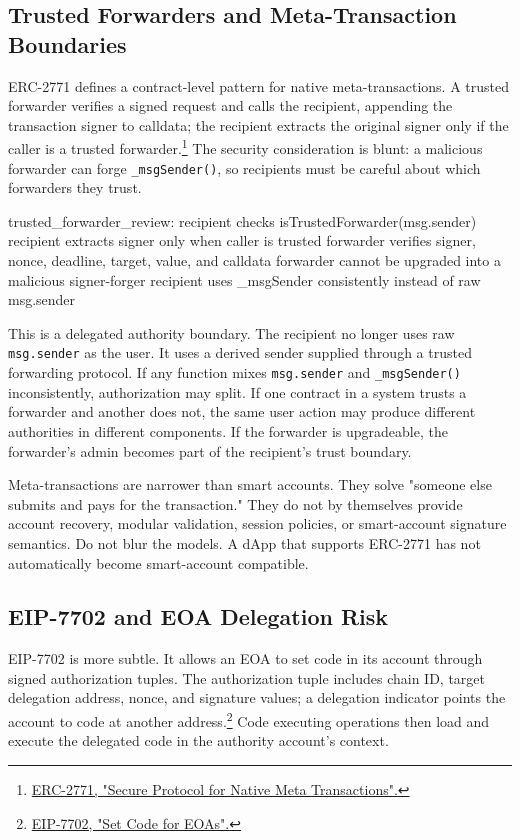 \subsection{Trusted Forwarders and Meta-Transaction Boundaries}

ERC-2771 defines a contract-level pattern for native meta-transactions. A trusted forwarder verifies a signed request and calls the recipient, appending the transaction signer to calldata; the recipient extracts the original signer only if the caller is a trusted forwarder.\footnote{\href{https://eips.ethereum.org/EIPS/eip-2771}{ERC-2771, "Secure Protocol for Native Meta Transactions".}} The security consideration is blunt: a malicious forwarder can forge \texttt{\_msgSender()}, so recipients must be careful about which forwarders they trust.

\begin{codeblock}
trusted_forwarder_review:
    recipient checks isTrustedForwarder(msg.sender)
    recipient extracts signer only when caller is trusted
    forwarder verifies signer, nonce, deadline, target, value, and calldata
    forwarder cannot be upgraded into a malicious signer-forger
    recipient uses _msgSender consistently instead of raw msg.sender
\end{codeblock}

This is a delegated authority boundary. The recipient no longer uses raw \texttt{msg.sender} as the user. It uses a derived sender supplied through a trusted forwarding protocol. If any function mixes \texttt{msg.sender} and \texttt{\_msgSender()} inconsistently, authorization may split. If one contract in a system trusts a forwarder and another does not, the same user action may produce different authorities in different components. If the forwarder is upgradeable, the forwarder's admin becomes part of the recipient's trust boundary.

Meta-transactions are narrower than smart accounts. They solve "someone else submits and pays for the transaction." They do not by themselves provide account recovery, modular validation, session policies, or smart-account signature semantics. Do not blur the models. A dApp that supports ERC-2771 has not automatically become smart-account compatible.

\subsection{EIP-7702 and EOA Delegation Risk}

EIP-7702 is more subtle. It allows an EOA to set code in its account through signed authorization tuples. The authorization tuple includes chain ID, target delegation address, nonce, and signature values; a delegation indicator points the account to code at another address.\footnote{\href{https://eips.ethereum.org/EIPS/eip-7702}{EIP-7702, "Set Code for EOAs".}} Code executing operations then load and execute the delegated code in the authority account's context.

